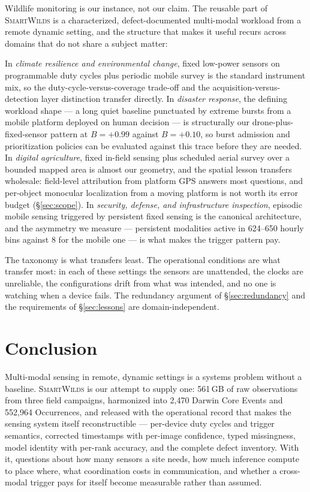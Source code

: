 \documentclass[sigconf]{acmart}
\newcommand{\smartwilds}{\textsc{SmartWilds}\xspace}
\begin{document}
Wildlife monitoring is our instance, not our claim. The reusable part of
\smartwilds is a characterized, defect-documented multi-modal workload
from a remote dynamic setting, and the structure that makes it useful
recurs across domains that do not share a subject matter:

In \emph{climate resilience and environmental change}, fixed low-power
sensors on programmable duty cycles plus periodic mobile survey is the
standard instrument mix, so the duty-cycle-versus-coverage trade-off and
the acquisition-versus-detection layer distinction transfer directly.
In \emph{disaster response}, the defining workload shape --- a long
quiet baseline punctuated by extreme bursts from a mobile platform
deployed on human decision --- is structurally our drone-plus-fixed-sensor
pattern at $B{=}+0.99$ against $B{=}+0.10$, so burst admission and
prioritization policies can be evaluated against this trace before they
are needed. In \emph{digital agriculture}, fixed in-field sensing plus
scheduled aerial survey over a bounded mapped area is almost our
geometry, and the spatial lesson transfers wholesale: field-level
attribution from platform GPS answers most questions, and per-object
monocular localization from a moving platform is not worth its error
budget (\S\ref{sec:scope}). In \emph{security, defense, and
infrastructure inspection}, episodic mobile sensing triggered by
persistent fixed sensing is the canonical architecture, and the
asymmetry we measure --- persistent modalities active in 624--650 hourly bins
against 8 for the mobile one --- is what makes the trigger pattern pay.

The taxonomy is what transfers least. The operational conditions are
what transfer most: in each of these settings the sensors are
unattended, the clocks are unreliable, the configurations drift from
what was intended, and no one is watching when a device fails. The
redundancy argument of \S\ref{sec:redundancy} and the requirements of
\S\ref{sec:lessons} are domain-independent.

\section{Conclusion}
\label{sec:conclusion}

Multi-modal sensing in remote, dynamic settings is a systems problem
without a baseline. \smartwilds is our attempt to supply one: 561\,GB of
raw observations from three field campaigns, harmonized into
2{,}470 Darwin Core Events and 552{,}964 Occurrences, and released with
the operational record that makes the sensing system itself
reconstructible --- per-device duty cycles and trigger semantics,
corrected timestamps with per-image confidence, typed missingness, model
identity with per-rank accuracy, and the complete defect inventory.
With it, questions about how many sensors a site needs, how much
inference compute to place where, what coordination costs in
communication, and whether a cross-modal trigger pays for itself become
measurable rather than assumed.
\end{document}
